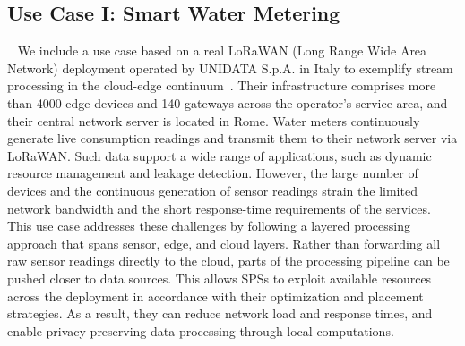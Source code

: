 \documentclass[runningheads]{llncs}
\begin{document}
\subsection{Use Case I: Smart Water Metering}~\label{sec:use-case}
We include a use case based on a real LoRaWAN (Long Range Wide Area Network) deployment operated by UNIDATA S.p.A. in Italy to exemplify stream processing in the cloud-edge continuum~\cite{domenico2023,lorawan}.
Their infrastructure comprises more than 4000 edge devices and 140 gateways across the operator's service area, and their central network server is located in Rome.
Water meters continuously generate live consumption readings and transmit them to their network server via LoRaWAN.
Such data support a wide range of applications, such as dynamic resource management and leakage detection.
However, the large number of devices and the continuous generation of sensor readings strain the limited network bandwidth and the short response-time requirements of the services.
This use case addresses these challenges by following a layered processing approach that spans sensor, edge, and cloud layers.
Rather than forwarding all raw sensor readings directly to the cloud, parts of the processing pipeline can be pushed closer to data sources.
This allows SPSs to exploit available resources across the deployment in accordance with their optimization and placement strategies.
As a result, they can reduce network load and response times, and enable privacy-preserving data processing through local computations.
\end{document}
